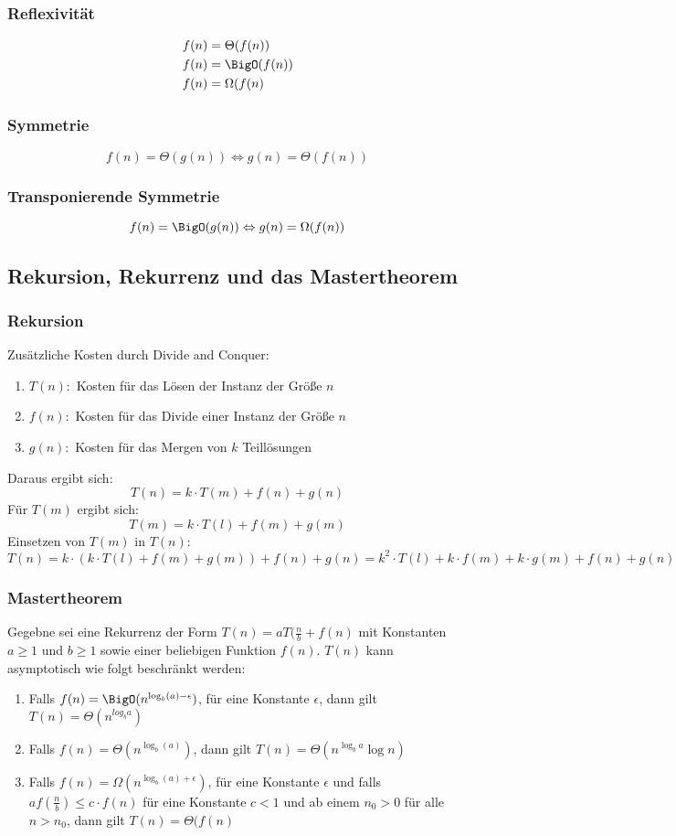 \documentclass[a4paper]{article}
\begin{document}
		\subsubsection{Reflexivität}
		\begin{align*}
			f(n)&=\Theta(f(n))\\
			f(n)&=\BigO(f(n))\\
			f(n)&=\Omega(f(n)
		\end{align*}
		\subsubsection{Symmetrie}

		$$f(n)=\Theta(g(n))\Leftrightarrow g(n)=\Theta(f(n))$$
		\subsubsection{Transponierende Symmetrie}
		
		$$f(n)=\BigO(g(n))\Leftrightarrow g(n)=\Omega(f(n))$$
		\subsection{Rekursion, Rekurrenz und das Mastertheorem}
		\subsubsection{Rekursion}
		Zusätzliche Kosten durch Divide and Conquer: \newline
		\begin{enumerate}
			\item $T(n): $ Kosten für das Lösen der Instanz der Größe $n$
			\item $f(n): $ Kosten für das Divide einer Instanz der Größe $n$
			\item $g(n): $ Kosten für das Mergen von $k$ Teillösungen
		\end{enumerate}
		Daraus ergibt sich: 
		$$
			T(n) = k \cdot T(m) + f(n) + g(n)
		$$
		Für $T(m)$ ergibt sich:
		$$
			T(m) = k \cdot T(l) + f(m) + g(m)
		$$
		Einsetzen von $T(m)$ in $T(n)$:
		$$
			T(n) = k \cdot (k \cdot T(l) + f(m) + g(m)) + f(n) + g(n) = k^2 \cdot T(l) + k \cdot f(m)+ k \cdot g(m) + f(n) + g(n)
		$$
		\subsubsection{Mastertheorem}
			Gegebne sei eine Rekurrenz der Form $T(n) = aT(\frac{n}{b}+f(n)$ mit Konstanten $a\geq 1$ und $b\geq 1$ sowie einer beliebigen Funktion $f(n)$. $T(n)$ kann asymptotisch wie folgt beschränkt werden:
			\begin{enumerate}
				\item Falls $f(n)=\BigO(n^{\log_b(a)-\epsilon})$, für eine Konstante $\epsilon$, dann gilt $T(n)=\Theta(n^{log_ba})$
				\item Falls $f(n)=\Theta(n^{\log_b(a)})$, dann gilt $T(n)=\Theta (n^{\log_ba}\log n)$
				\item Falls $f(n)=\Omega(n^{\log_b(a)+\epsilon})$, für eine Konstante $\epsilon$ und falls $af(\frac{n}{b})\leq c\cdot f(n)$ für eine Konstante $c<1$ und ab einem $n_0>0$ für alle $n>n_0$, dann gilt $T(n)=\Theta(f(n)$
			\end{enumerate}
\end{document}
